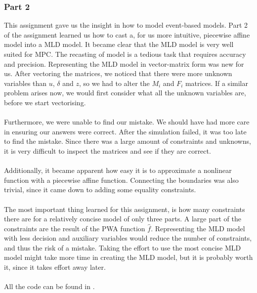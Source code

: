 \subsubsection*{Part 2}
This assignment gave us the insight in how to model event-based models. Part 2 of the assignment learned us how to cast a, for us more intuitive, piecewise affine model into a MLD model. It became clear that the MLD model is very well suited for MPC. The recasting of model is a tedious task that requires accuracy and precision. Representing the MLD model in vector-matrix form was new for us. After vectoring the matrices, we noticed that there were more unknown variables than $u$, $\delta$ and $z$, so we had to alter the $M_i$ and $F_i$ matrices. If a similar problem arises now, we would first consider what all the unknown variables are, before we start vectorising.\\
\\
Furthermore, we were unable to find our mistake. We should have had more care in ensuring our answers were correct. After the simulation failed, it was too late to find the mistake. Since there was a large amount of constraints and unknowns, it is very difficult to inspect the matrices and see if they are correct.\\
\\
Additionally, it became apparent how easy it is to approximate a nonlinear function with a piecewise affine function. Connecting the boundaries was also trivial, since it came down to adding some equality constraints.\\
\\
The most important thing learned for this assignment, is how many constraints there are for a relatively concise model of only three parts. A large part of the constraints are the result of the PWA function $\hat{f}$. Representing the MLD model with less decision and auxiliary variables would reduce the number of constraints, and thus the risk of a mistake. Taking the effort to use the most concise MLD model might take more time in creating the MLD model, but it is probably worth it, since it takes effort away later.\\
\\
All the code can be found in \cite{GIT}.